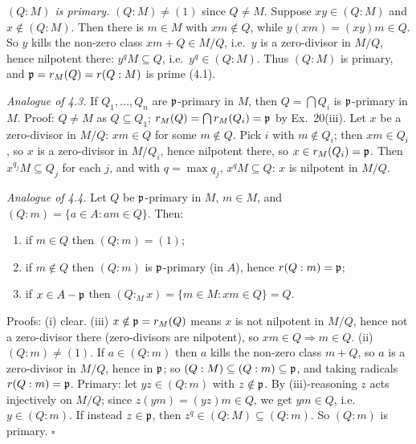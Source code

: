 \documentclass[11pt]{article}
\begin{document}
\pf
\emph{$(Q:M)$ is primary.} $(Q:M)\ne(1)$ since $Q\ne M$. Suppose $xy\in(Q:M)$ and $x\notin(Q:M)$. Then there is $m\in M$ with $xm\notin Q$, while $y(xm)=(xy)m\in Q$. So $y$ kills the non-zero class $xm+Q\in M/Q$, i.e.\ $y$ is a zero-divisor in $M/Q$, hence nilpotent there: $y^qM\subseteq Q$, i.e.\ $y^q\in(Q:M)$. Thus $(Q:M)$ is primary, and $\mathfrak p=r_M(Q)=r(Q:M)$ is prime (4.1).

\emph{Analogue of 4.3.} If $Q_1,\dots,Q_n$ are $\mathfrak p$-primary in $M$, then $Q=\bigcap Q_i$ is $\mathfrak p$-primary in $M$. Proof: $Q\ne M$ as $Q\subseteq Q_1$; $r_M(Q)=\bigcap r_M(Q_i)=\mathfrak p$ by Ex.~20(iii). Let $x$ be a zero-divisor in $M/Q$: $xm\in Q$ for some $m\notin Q$. Pick $i$ with $m\notin Q_i$; then $xm\in Q_i$, so $x$ is a zero-divisor in $M/Q_i$, hence nilpotent there, so $x\in r_M(Q_i)=\mathfrak p$. Then $x^{q_j}M\subseteq Q_j$ for each $j$, and with $q=\max q_j$, $x^qM\subseteq Q$: $x$ is nilpotent in $M/Q$.

\emph{Analogue of 4.4.} Let $Q$ be $\mathfrak p$-primary in $M$, $m\in M$, and $(Q:m)=\{a\in A:am\in Q\}$. Then:
\begin{enumerate}[label=(\roman*),leftmargin=*]
\item if $m\in Q$ then $(Q:m)=(1)$;
\item if $m\notin Q$ then $(Q:m)$ is $\mathfrak p$-primary (in $A$), hence $r(Q:m)=\mathfrak p$;
\item if $x\in A-\mathfrak p$ then $(Q:_Mx)=\{m\in M:xm\in Q\}=Q$.
\end{enumerate}
Proofs: (i) clear. (iii) $x\notin\mathfrak p=r_M(Q)$ means $x$ is not nilpotent in $M/Q$, hence not a zero-divisor there (zero-divisors are nilpotent), so $xm\in Q\Rightarrow m\in Q$. (ii) $(Q:m)\ne(1)$. If $a\in(Q:m)$ then $a$ kills the non-zero class $m+Q$, so $a$ is a zero-divisor in $M/Q$, hence in $\mathfrak p$; so $(Q:M)\subseteq(Q:m)\subseteq\mathfrak p$, and taking radicals $r(Q:m)=\mathfrak p$. Primary: let $yz\in(Q:m)$ with $z\notin\mathfrak p$. By (iii)-reasoning $z$ acts injectively on $M/Q$; since $z(ym)=(yz)m\in Q$, we get $ym\in Q$, i.e.\ $y\in(Q:m)$. If instead $z\in\mathfrak p$, then $z^q\in(Q:M)\subseteq(Q:m)$. So $(Q:m)$ is primary. \hfill$\square$
\end{document}
